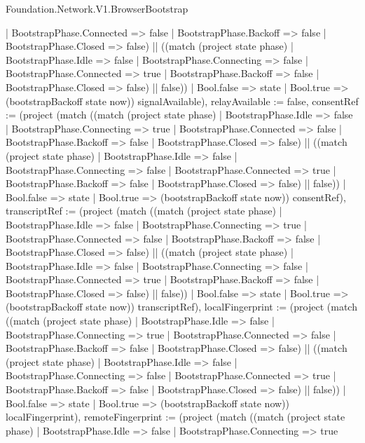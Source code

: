 \begin{lexlean}{Foundation.Network.V1.BrowserBootstrap}
\begin{semanticmodule}
{{          | BootstrapPhase.Connected => false
          | BootstrapPhase.Backoff => false
          | BootstrapPhase.Closed => false) || ((match (project state phase)
          | BootstrapPhase.Idle => false
          | BootstrapPhase.Connecting => false
          | BootstrapPhase.Connected => true
          | BootstrapPhase.Backoff => false
          | BootstrapPhase.Closed => false) || false))
        | Bool.false => state
        | Bool.true => (bootstrapBackoff state now)) signalAvailable), relayAvailable := false, consentRef := (project (match ((match (project state phase)
          | BootstrapPhase.Idle => false
          | BootstrapPhase.Connecting => true
          | BootstrapPhase.Connected => false
          | BootstrapPhase.Backoff => false
          | BootstrapPhase.Closed => false) || ((match (project state phase)
          | BootstrapPhase.Idle => false
          | BootstrapPhase.Connecting => false
          | BootstrapPhase.Connected => true
          | BootstrapPhase.Backoff => false
          | BootstrapPhase.Closed => false) || false))
        | Bool.false => state
        | Bool.true => (bootstrapBackoff state now)) consentRef), transcriptRef := (project (match ((match (project state phase)
          | BootstrapPhase.Idle => false
          | BootstrapPhase.Connecting => true
          | BootstrapPhase.Connected => false
          | BootstrapPhase.Backoff => false
          | BootstrapPhase.Closed => false) || ((match (project state phase)
          | BootstrapPhase.Idle => false
          | BootstrapPhase.Connecting => false
          | BootstrapPhase.Connected => true
          | BootstrapPhase.Backoff => false
          | BootstrapPhase.Closed => false) || false))
        | Bool.false => state
        | Bool.true => (bootstrapBackoff state now)) transcriptRef), localFingerprint := (project (match ((match (project state phase)
          | BootstrapPhase.Idle => false
          | BootstrapPhase.Connecting => true
          | BootstrapPhase.Connected => false
          | BootstrapPhase.Backoff => false
          | BootstrapPhase.Closed => false) || ((match (project state phase)
          | BootstrapPhase.Idle => false
          | BootstrapPhase.Connecting => false
          | BootstrapPhase.Connected => true
          | BootstrapPhase.Backoff => false
          | BootstrapPhase.Closed => false) || false))
        | Bool.false => state
        | Bool.true => (bootstrapBackoff state now)) localFingerprint), remoteFingerprint := (project (match ((match (project state phase)
          | BootstrapPhase.Idle => false
          | BootstrapPhase.Connecting => true
}}
\end{semanticmodule}
\end{lexlean}
